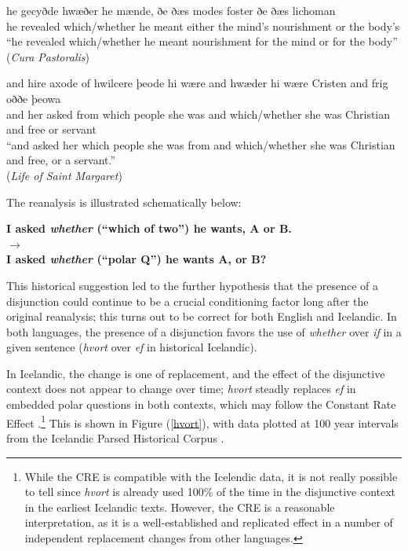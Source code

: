 \begin{exe}
    	\ex \label{oe1} \gll he gecyðde hwæðer            he mænde, ðe      ðæs modes foster           ðe ðæs lichoman \\
	he revealed which/whether he meant either the  mind's nourishment or the  body's\\
	\quad ``he revealed which/whether he meant nourishment for the mind or for the body''\\
	(\textsl{Cura Pastoralis})
	
		\ex \label{oe2} \gll and hire axode of    hwilcere þeode  hi  wære and hwæder             hi  wære Cristen    and frig oððe þeowa  \\
	and her  asked from which    people she was and which/whether she was   Christian and free or     servant\\
	\quad ``and asked her which people she was from and which/whether she was Christian and free, or a servant.''\\
	(\textsl{Life of Saint Margaret})
	
\end{exe}

\noindent The reanalysis is illustrated schematically below:

\begin{center}
 \textbf{I asked \textsl{whether} (``which of two'') he wants, A or B.} \\$\longrightarrow$ 
 \\ \textbf{I asked \textsl{whether} (``polar Q'') he wants A, or B?}
\end{center}

This historical suggestion led to the further hypothesis that the presence of a disjunction could continue to be a crucial conditioning factor long after the original reanalysis; this turns out to be correct for both English and Icelandic. 
In both languages, the presence of a disjunction favors the use of \textsl{whether} over \textsl{if} in a given sentence (\textsl{hvort} over \textsl{ef} in historical Icelandic).

In Icelandic, the change is one of replacement, and the effect of the disjunctive context does not appear to change over time; \textsl{hvort} steadly replaces \textsl{ef} in embedded polar questions in both contexts, which may follow the Constant Rate Effect \citep{kroch1989}.\footnote{While the CRE is compatible with the Icelendic data, it is not really possible to tell since \textsl{hvort} is already used 100\% of the time in the disjunctive context in the earliest Icelandic texts.
However, the CRE is a reasonable interpretation, as it is a well-established and replicated effect in a number of independent replacement changes from other languages.}
This is shown in Figure (\ref{hvort}), with data plotted at 100 year intervals from the Icelandic Parsed Historical Corpus \citep[IcePaHC][]{icepahc09}.


